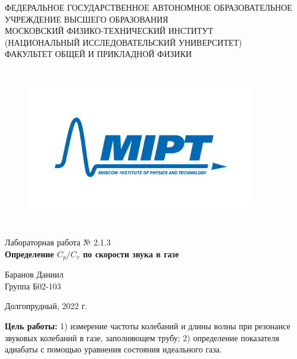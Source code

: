 \documentclass[a4paper,12pt]{article} %
\begin{document}
\begin{center}
	\footnotesize{ФЕДЕРАЛЬНОЕ ГОСУДАРСТВЕННОЕ АВТОНОМНОЕ ОБРАЗОВАТЕЛЬНОЕ 			УЧРЕЖДЕНИЕ ВЫСШЕГО ОБРАЗОВАНИЯ}\\
	\footnotesize{МОСКОВСКИЙ ФИЗИКО-ТЕХНИЧЕСКИЙ ИНСТИТУТ\\(НАЦИОНАЛЬНЫЙ 			ИССЛЕДОВАТЕЛЬСКИЙ УНИВЕРСИТЕТ)}\\
	\footnotesize{ФАКУЛЬТЕТ ОБЩЕЙ И ПРИКЛАДНОЙ ФИЗИКИ\\}
	\hfill \break
	\hfill \break
	\hfill \break
	\hfill \break
\end{center}


\begin{figure}[h]
    \centering
    \includegraphics*[width=10cm,height=7cm,keepaspectratio]{mipt_eng_text_png.png}
    \label{fig:my_label}
\end{figure}


\begin{center}   
    \hfill \break
	\hfill \break
	\hfill \break
	\hfill \break
	\large{Лабораторная работа № 2.1.3\\\textbf{Определение $\displaystyle C_p/C_v$ по скорости звука в газе}}\\
	\hfill \break
	\hfill \break
	\hfill \break
	\hfill \break
	\begin{flushright}
		Баранов Даниил\\
		Группа Б02-103
	\end{flushright}
	\hfill \break
	\hfill \break
	\hfill \break
\end{center}
\hfill \break
\hfill \break
\hfill \break
\hfill \break
\begin{center}
	Долгопрудный, 2022 г.
\end{center}
\thispagestyle{empty}



\newpage

\textbf{Цель работы:} 1) измерение частоты колебаний и длины волны при резонансе звуковых колебаний в газе, заполняющем трубу; 2) определение показателя адиабаты с помощью уравнения состояния идеального газа.\hfill
\break
	
\end{document}
